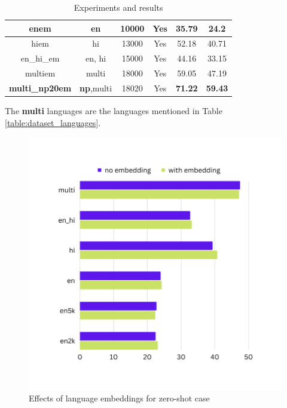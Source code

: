 \begin{table}[ht]
\begin{center}
\begin{tabular}{|c|c|c|c|c|c|}
            \hline
            enem & en & 10000 & Yes & 35.79 & 24.2 \\
            \hline
            hiem & hi & 13000 & Yes & 52.18 & 40.71 \\
            \hline
            en\_hi\_em & en, hi & 15000 & Yes & 44.16 & 33.15 \\
            \hline
            multiem & multi & 18000 & Yes & 59.05 & 47.19 \\
            \hline
            \textbf{multi\_np20em} & \textbf{np},multi & 18020 & Yes & \textbf{71.22} & \textbf{59.43} \\
            \hline
        \end{tabular}
        \caption{Experiments and results}
        \label{table:experiments_results}
    \end{center}
\end{table}
The \textbf{multi} languages are the languages mentioned in Table \ref{table:dataset_languages}.

\begin{figure}[!h]
    \center
    \includegraphics[scale=0.3]{images/results}
    \caption{Effects of language embeddings for zero-shot case}
    \label{results}
\end{figure}

